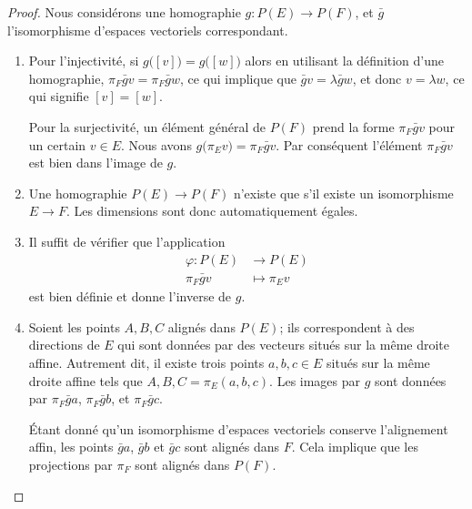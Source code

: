 \begin{proof}
    Nous considérons une homographie \( g\colon P(E)\to P(F)\), et \( \bar g\) l'isomorphisme d'espaces vectoriels correspondant.
    \begin{enumerate}
        \item
            Pour l'injectivité, si \( g\big( [v] \big)=g\big( [w] \big)\) alors en utilisant la définition d'une homographie, \( \pi_F\bar gv=\pi_F\bar gw\), ce qui implique que \( \bar gv=\lambda\bar gw\), et donc \( v=\lambda w\), ce qui signifie \( [v]=[w]\).

            Pour la surjectivité, un élément général de \( P(F)\) prend la forme \( \pi_F\bar gv\) pour un certain \( v\in E\). Nous avons \( g\big( \pi_Ev \big)=\pi_F\bar gv\). Par conséquent l'élément \( \pi_F\bar gv\) est bien dans l'image de \( g\).

        \item
            Une homographie \( P(E)\to P(F)\) n'existe que s'il existe un isomorphisme \( E\to F\). Les dimensions sont donc automatiquement égales.
        \item
            Il suffit de vérifier que l'application
            \begin{equation}
                \begin{aligned}
                    \varphi\colon P(E)&\to P(E) \\
                    \pi_F\bar gv&\mapsto \pi_Ev 
                \end{aligned}
            \end{equation}
            est bien définie et donne l'inverse de \( g\).
        \item
            Soient les points \( A,B,C\) alignés dans \( P(E)\); ils correspondent à des directions de \( E\) qui sont données par des vecteurs situés sur la même droite affine. Autrement dit, il existe trois points \( a,b,c\in E\) situés sur la même droite affine tels que \( A,B,C=\pi_E(a,b,c)\). Les images par \( g\) sont données par \( \pi_F\bar ga\), \( \pi_F\bar gb\), et \( \pi_F\bar gc\).

            Étant donné qu'un isomorphisme d'espaces vectoriels conserve l'alignement affin, les points \( \bar ga\), \( \bar gb\) et \( \bar gc\) sont alignés dans \( F\). Cela implique que les projections par \( \pi_F\) sont alignés dans \( P(F)\).
    \end{enumerate}
\end{proof}

